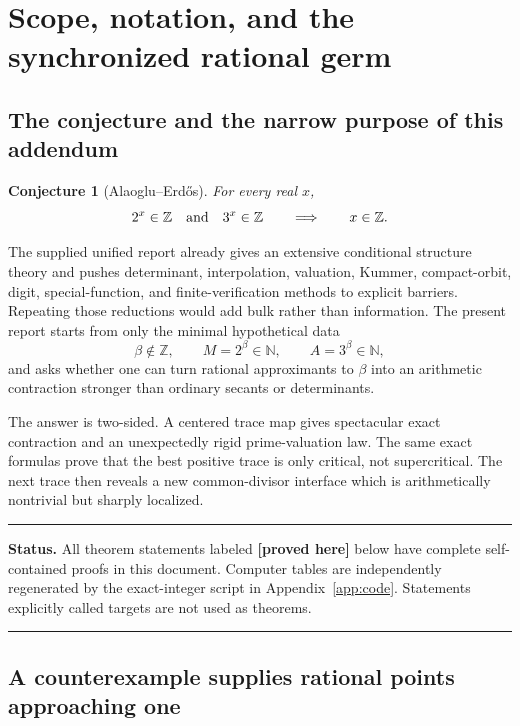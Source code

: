 \documentclass[11pt,oneside]{article}
\newtheorem{conjecture}[theorem]{Conjecture}
\theoremstyle{definition}
\theoremstyle{remark}
\newcommand{\N}{\mathbb N}
\newcommand{\Z}{\mathbb Z}
\newcommand{\statusproved}{\textcolor{proofgreen}{\textbf{[proved here]}}}
\newenvironment{statusbox}[1]
{\begin{center}\begin{minipage}{0.94\textwidth}\raggedright\hrule\vspace{0.42em}
\textbf{Status.} #1\par\vspace{0.32em}}
{\vspace{0.32em}\hrule\end{minipage}\end{center}}
\begin{document}
\tableofcontents
\clearpage
{}

\section{Scope, notation, and the synchronized rational germ}
\label{sec:scope}

\subsection{The conjecture and the narrow purpose of this addendum}

\begin{conjecture}[Alaoglu--Erd\H{o}s]
For every real \(x\),
\[
 2^x\in\Z\quad\hbox{and}\quad3^x\in\Z
 \qquad\Longrightarrow\qquad x\in\Z.
\]
\end{conjecture}

The supplied unified report already gives an extensive conditional structure theory and
pushes determinant, interpolation, valuation, Kummer, compact-orbit, digit, special-function,
and finite-verification methods to explicit barriers.  Repeating those reductions would add
bulk rather than information.  The present report starts from only the minimal hypothetical
data
\begin{equation}
 \beta\notin\Z,\qquad M=2^\beta\in\N,\qquad A=3^\beta\in\N,
 \label{eq:hypothesis}
\end{equation}
and asks whether one can turn rational approximants to \(\beta\) into an arithmetic
contraction stronger than ordinary secants or determinants.

The answer is two-sided.  A centered trace map gives spectacular exact contraction and an
unexpectedly rigid prime-valuation law.  The same exact formulas prove that the best positive
trace is only critical, not supercritical.  The next trace then reveals a new common-divisor
interface which is arithmetically nontrivial but sharply localized.

\begin{statusbox}{All theorem statements labeled \statusproved{} below have complete
self-contained proofs in this document.  Computer tables are independently regenerated by
the exact-integer script in Appendix~\ref{app:code}.  Statements explicitly called targets
are not used as theorems.}
\end{statusbox}

\subsection{A counterexample supplies rational points approaching one}
\end{document}
